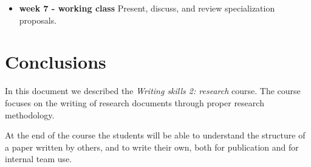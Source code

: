 \documentclass{article}
\begin{document}
\begin{itemize}
\item \textbf{week 7 - working class} Present, discuss, and review specialization proposals.

\end{itemize}

\section{Conclusions}
In this document we described the \textit{Writing skills 2: research} course. The course focuses on the writing of research documents through proper research methodology.

At the end of the course the students will be able to understand the structure of a paper written by others, and to write their own, both for publication and for internal team use.
\end{document}
